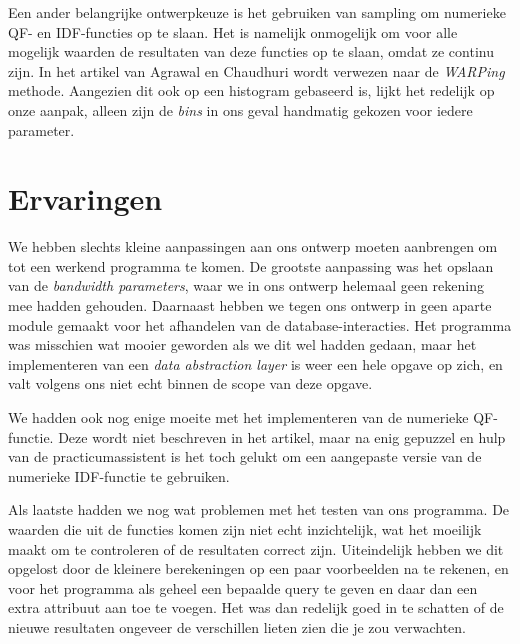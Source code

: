 \documentclass[a4paper,oneside]{article}
\begin{document}
Een ander belangrijke ontwerpkeuze is het gebruiken van sampling om numerieke QF- en IDF-functies op te slaan. Het is namelijk onmogelijk om voor alle mogelijk waarden de resultaten van deze functies op te slaan, omdat ze continu zijn. In het artikel van Agrawal en Chaudhuri wordt verwezen naar de \emph{WARPing} methode. Aangezien dit ook op een histogram gebaseerd is, lijkt het redelijk op onze aanpak, alleen zijn de \emph{bins} in ons geval handmatig gekozen voor iedere parameter.


\section{Ervaringen}
We hebben slechts kleine aanpassingen aan ons ontwerp moeten aanbrengen om tot een werkend programma te komen. De grootste aanpassing was het opslaan van de \emph{bandwidth parameters}, waar we in ons ontwerp helemaal geen rekening mee hadden gehouden. Daarnaast hebben we tegen ons ontwerp in geen aparte module gemaakt voor het afhandelen van de database-interacties. Het programma was misschien wat mooier geworden als we dit wel hadden gedaan, maar het implementeren van een \emph{data abstraction layer} is weer een hele opgave op zich, en valt volgens ons niet echt binnen de scope van deze opgave.

We hadden ook nog enige moeite met het implementeren van de numerieke QF-functie. Deze wordt niet beschreven in het artikel, maar na enig gepuzzel en hulp van de practicumassistent is het toch gelukt om een aangepaste versie van de numerieke IDF-functie te gebruiken.

Als laatste hadden we nog wat problemen met het testen van ons programma. De waarden die uit de functies komen zijn niet echt inzichtelijk, wat het moeilijk maakt om te controleren of de resultaten correct zijn. Uiteindelijk hebben we dit opgelost door de kleinere berekeningen op een paar voorbeelden na te rekenen, en voor het programma als geheel een bepaalde query te geven en daar dan een extra attribuut aan toe te voegen. Het was dan redelijk goed in te schatten of de nieuwe resultaten ongeveer de verschillen lieten zien die je zou verwachten.
\end{document}
